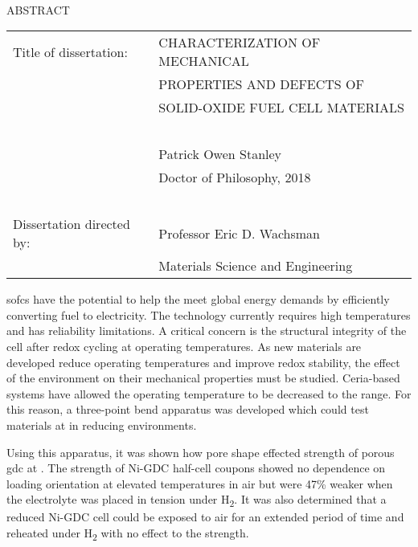 
\hbox{\ }

\renewcommand{\baselinestretch}{1}
\small \normalsize

\begin{center}
\large{{ABSTRACT}}

\vspace{3em}

\end{center}
\hspace{-.15in}
\begin{tabular}{ll}
Title of dissertation:    & {\large  CHARACTERIZATION OF MECHANICAL}\\
&				      {\large  PROPERTIES AND DEFECTS OF  } \\
&				      {\large  SOLID-OXIDE FUEL CELL MATERIALS } \\
\ \\
&                          {\large  Patrick Owen Stanley} \\
&                           {\large Doctor of Philosophy, 2018}\\
\ \\
Dissertation directed by: & {\large  Professor Eric D. Wachsman} \\
&  				{\large	 Materials Science and Engineering } \\
\end{tabular}

\vspace{3em}

\renewcommand{\baselinestretch}{2}
\large \normalsize


\Glspl{sofc} have the potential to help the meet global energy demands by efficiently converting fuel to electricity.
The technology currently requires high temperatures and has reliability limitations.
A critical concern is the structural integrity of the cell after redox cycling at operating temperatures.
As new materials are developed reduce operating temperatures and improve redox stability, the effect of the environment on their mechanical properties must be studied.
Ceria-based systems have allowed the operating temperature to be decreased to the  range.
For this reason, a three-point bend apparatus was developed which could test materials at  in reducing environments.

Using this apparatus, it was shown how pore shape effected strength of porous \gls{gdc} at .
The strength of Ni-GDC half-cell coupons showed no dependence  on loading orientation at elevated temperatures in air but were 47\% weaker when the electrolyte was placed in tension under H\textsubscript{2}.
It was also determined that a reduced Ni-GDC cell could be exposed to air for an extended period of time and reheated under H\textsubscript{2} with no effect to the strength.

